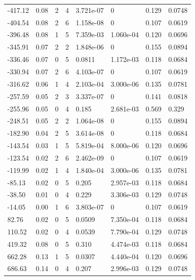 \documentclass[preview]{standalone}
\begin{document}
{{\begin{tabular}{L{1.2cm}C{1.2cm} C{0.3cm}C{0.5cm} C{1.4cm}C{1.4cm} C{1.4cm}C{1.4cm}}
  -417.12  &  0.08  & 2     &  4 &  3.721e-07  & 0  & 0.129 &  0.0748   \\ 
  -404.54  &  0.08  & 2     &  6 &  1.158e-08  & 0  & 0.107 &  0.0619   \\ 
  -396.48  &  0.08  & 1     &  5 &  7.359e-03  & 1.060e-04  & 0.120 &  0.0696   \\ 
  -345.91  &  0.07  & 2     &  2 &  1.848e-06  & 0  & 0.155 &  0.0894   \\ 
  -336.46  &  0.07  & 0     &  5 &  0.0811  & 1.172e-03  & 0.118 &  0.0684   \\ 
  -330.94  &  0.07  & 2     &  6 &  4.103e-07  & 0  & 0.107 &  0.0619   \\ 
  -316.62  &  0.06  & 1     &  4 &  2.103e-04  & 3.000e-06  & 0.135 &  0.0781   \\ 
  -257.59  &  0.05  & 2     &  3 &  3.337e-07  & 0  & 0.141 &  0.0818   \\ 
  -255.96  &  0.05  & 0     &  4 &  0.185  & 2.681e-03  & 0.569 &  0.329   \\ 
  -248.51  &  0.05  & 2     &  2 &  1.064e-08  & 0  & 0.155 &  0.0894   \\ 
  -182.90  &  0.04  & 2     &  5 &  3.614e-08  & 0  & 0.118 &  0.0684   \\ 
  -143.54  &  0.03  & 1     &  5 &  5.819e-04  & 8.000e-06  & 0.120 &  0.0696   \\ 
  -123.54  &  0.02  & 2     &  6 &  2.462e-09  & 0  & 0.107 &  0.0619   \\ 
  -119.99  &  0.02  & 1     &  4 &  1.840e-04  & 3.000e-06  & 0.135 &  0.0781   \\ 
  -85.13  &  0.02  & 0     &  5 &  0.205  & 2.957e-03  & 0.118 &  0.0684   \\ 
  -38.50  &  0.01  & 0     &  4 &  0.229  & 3.306e-03  & 0.129 &  0.0748   \\ 
  -14.05  &  0.00  & 1     &  6 &  3.803e-07  & 0  & 0.107 &  0.0619   \\ 
  82.76  &  0.02  & 0     &  5 &  0.0509  & 7.350e-04  & 0.118 &  0.0684   \\ 
  110.52  &  0.02  & 0     &  4 &  0.0539  & 7.790e-04  & 0.129 &  0.0748   \\ 
  419.32  &  0.08  & 0     &  5 &  0.310  & 4.474e-03  & 0.118 &  0.0684   \\ 
  662.28  &  0.13  & 1     &  5 &  0.0307  & 4.440e-04  & 0.120 &  0.0696   \\ 
  686.63  &  0.14  & 0     &  4 &  0.207  & 2.996e-03  & 0.129 &  0.0748   \\ 

\end{tabular}}}
\end{document}
